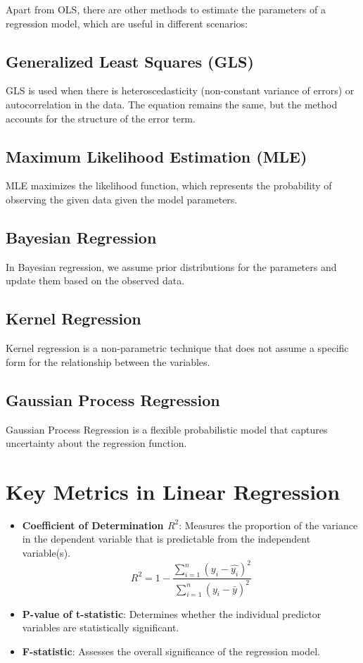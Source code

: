 \documentclass{article}
\begin{document}
Apart from OLS, there are other methods to estimate the parameters of a regression model, which are useful in different scenarios:

\subsection{Generalized Least Squares (GLS)}
GLS is used when there is heteroscedasticity (non-constant variance of errors) or autocorrelation in the data. The equation remains the same, but the method accounts for the structure of the error term.

\subsection{Maximum Likelihood Estimation (MLE)}
MLE maximizes the likelihood function, which represents the probability of observing the given data given the model parameters.

\subsection{Bayesian Regression}
In Bayesian regression, we assume prior distributions for the parameters and update them based on the observed data.

\subsection{Kernel Regression}
Kernel regression is a non-parametric technique that does not assume a specific form for the relationship between the variables.

\subsection{Gaussian Process Regression}
Gaussian Process Regression is a flexible probabilistic model that captures uncertainty about the regression function.

\newpage
\section{Key Metrics in Linear Regression}

\begin{itemize}
    \item \textbf{Coefficient of Determination \(R^2\)}: Measures the proportion of the variance in the dependent variable that is predictable from the independent variable(s).
    \[
    R^2 = 1 - \frac{\sum_{i=1}^{n} (y_i - \hat{y_i})^2}{\sum_{i=1}^{n} (y_i - \bar{y})^2}
    \]
    \item \textbf{P-value of t-statistic}: Determines whether the individual predictor variables are statistically significant.
    \item \textbf{F-statistic}: Assesses the overall significance of the regression model.
\end{itemize}
\end{document}
